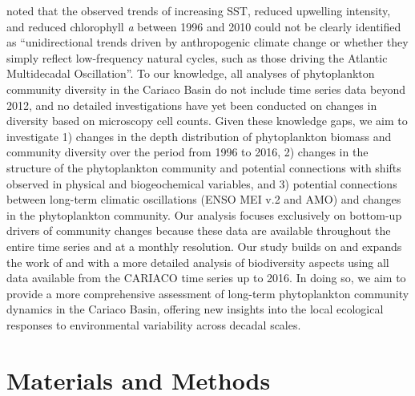 \documentclass[]{agujournal2019}
\begin{document}
  noted that the observed trends of increasing SST, reduced upwelling intensity, and reduced chlorophyll \textit{a} between 1996 and 2010 could not be clearly identified as ``unidirectional trends driven by anthropogenic climate change or whether they simply reflect low-frequency natural cycles, such as those driving the Atlantic Multidecadal Oscillation''. To our knowledge, all analyses of phytoplankton community diversity in the Cariaco Basin do not include time series data beyond 2012, and no detailed investigations have yet been conducted on changes in diversity based on microscopy cell counts. Given these knowledge gaps, we aim to investigate 1) changes in the depth distribution of phytoplankton biomass and community diversity over the period from 1996 to 2016, 2) changes in the structure of the phytoplankton community and potential connections with shifts observed in physical and biogeochemical variables, and 3) potential connections between long-term climatic oscillations (ENSO MEI v.2 and AMO) and changes in the phytoplankton community. Our analysis focuses exclusively on bottom-up drivers of community changes because these data are available throughout the entire time series and at a monthly resolution. Our study builds on and expands the work of  and  with a more detailed analysis of biodiversity aspects using all data available from the CARIACO time series up to 2016. In doing so, we aim to provide a more comprehensive assessment of long-term phytoplankton community dynamics in the Cariaco Basin, offering new insights into the local ecological responses to environmental variability across decadal scales.
   


\section{Materials and Methods}
%
\end{document}
